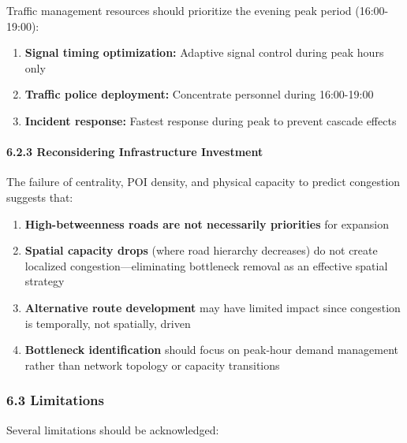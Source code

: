 Traffic management resources should prioritize the evening peak period (16:00-19:00):

\begin{enumerate}
\def\labelenumi{\arabic{enumi}.}
\tightlist
\item
  \textbf{Signal timing optimization:} Adaptive signal control during peak hours only
\item
  \textbf{Traffic police deployment:} Concentrate personnel during 16:00-19:00
\item
  \textbf{Incident response:} Fastest response during peak to prevent cascade effects
\end{enumerate}

\paragraph{6.2.3 Reconsidering Infrastructure Investment}\label{reconsidering-infrastructure-investment}

The failure of centrality, POI density, and physical capacity to predict congestion suggests that:

\begin{enumerate}
\def\labelenumi{\arabic{enumi}.}
\tightlist
\item
  \textbf{High-betweenness roads are not necessarily priorities} for expansion
\item
  \textbf{Spatial capacity drops} (where road hierarchy decreases) do not create localized congestion---eliminating bottleneck removal as an effective spatial strategy
\item
  \textbf{Alternative route development} may have limited impact since congestion is temporally, not spatially, driven
\item
  \textbf{Bottleneck identification} should focus on peak-hour demand management rather than network topology or capacity transitions
\end{enumerate}

\subsubsection{6.3 Limitations}\label{limitations}

Several limitations should be acknowledged:

